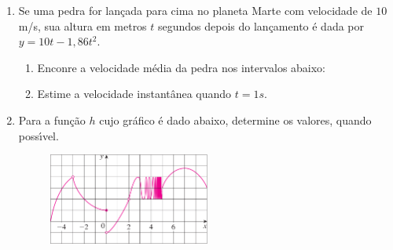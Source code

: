 \documentclass[a4paper,5pt]{amsbook}
\begin{document}
\vspace{1cm}
\begin{enumerate}
    \vspace{0.5cm}
    \item Se uma pedra for lan\c{c}ada para cima no planeta Marte com velocidade de
        $10$m/s, sua altura em metros $t$ segundos depois do lan\c{c}amento \'e dada
        por $y=10t-1,86t^2$.
        \begin{enumerate}
            \item Enconre a velocidade m\'edia da pedra nos intervalos abaixo:

                \begin{enumerate*}
                    \item $[1,\ 2]$
                        \hspace{0.2cm}
                        \hspace{0.2cm}
                    \item $[1,\ 1,5]$
                        \hspace{0.2cm}
                        \hspace{0.2cm}
                    \item $[1,\ 1,1]$
                        \hspace{0.2cm}
                        \hspace{0.2cm}
                    \item $[1,\ 1,01]$
                        \hspace{0.2cm}
                        \hspace{0.2cm}
                    \item $[1,\ 1,001]$
                \end{enumerate*}
            \item Estime a velocidade instant\^anea quando $t=1s$.
        \end{enumerate}

    \vspace{0.5cm}
    \item Para a fun\c{c}\~ao $h$ cujo gr\'afico \'e dado abaixo, determine os valores,
        quando poss\'{\i}vel.
        \begin{figure}[h]
            \centering
            \includegraphics[width=0.5\textwidth]{lista-04-fig1.png}
        \end{figure}


\end{enumerate}
\end{document}
